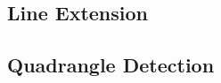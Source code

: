 \subsection{Line Extension} %
\label{sub:analyse_line_extension}


\subsection{Quadrangle Detection} %
\label{sub:analyse_quadrangle_detection}


